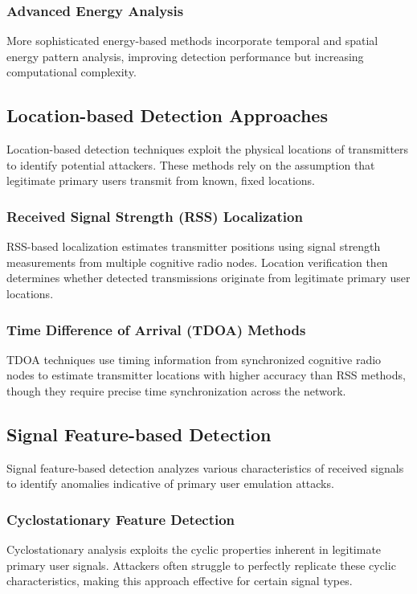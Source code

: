 \subsubsection{Advanced Energy Analysis}
More sophisticated energy-based methods incorporate temporal and spatial energy pattern analysis, improving detection performance but increasing computational complexity.

\subsection{Location-based Detection Approaches}
Location-based detection techniques exploit the physical locations of transmitters to identify potential attackers. These methods rely on the assumption that legitimate primary users transmit from known, fixed locations.

\subsubsection{Received Signal Strength (RSS) Localization}
RSS-based localization estimates transmitter positions using signal strength measurements from multiple cognitive radio nodes. Location verification then determines whether detected transmissions originate from legitimate primary user locations.

\subsubsection{Time Difference of Arrival (TDOA) Methods}
TDOA techniques use timing information from synchronized cognitive radio nodes to estimate transmitter locations with higher accuracy than RSS methods, though they require precise time synchronization across the network.

\subsection{Signal Feature-based Detection}
Signal feature-based detection analyzes various characteristics of received signals to identify anomalies indicative of primary user emulation attacks.

\subsubsection{Cyclostationary Feature Detection}
Cyclostationary analysis exploits the cyclic properties inherent in legitimate primary user signals. Attackers often struggle to perfectly replicate these cyclic characteristics, making this approach effective for certain signal types.

